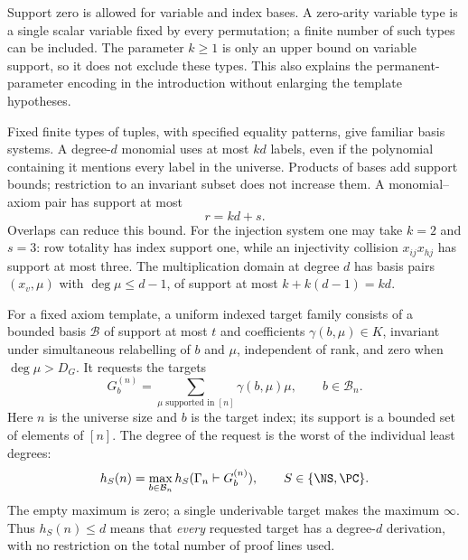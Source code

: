 Support zero is allowed for variable and index bases. A zero-arity
variable type is a single scalar variable fixed by every permutation;
a finite number of such types can be included. The parameter $k\ge1$
is only an upper bound on variable support, so it does not exclude these
types. This also explains the permanent-parameter encoding in the
introduction without enlarging the template hypotheses.

Fixed finite types of tuples, with specified equality patterns, give
familiar basis systems. A degree-$d$ monomial uses at most $kd$ labels,
even if the polynomial containing it mentions every label in the
universe. Products of bases add support bounds; restriction to an
invariant subset does not increase them. A monomial--axiom pair has
support at most
\begin{equation}\label{eq:safe-budget}
                         r=kd+s.
\end{equation}
Overlaps can reduce this bound. For the injection system one may take
$k=2$ and $s=3$: row totality has index support one, while an
injectivity collision $x_{ij}x_{hj}$ has support at most three. The
multiplication domain at degree $d$ has basis pairs $(x_v,\mu)$ with
$\deg\mu\le d-1$, of support at most $k+k(d-1)=kd$.

\begin{definition}\label{def:uniform-target}
For a fixed axiom template, a uniform indexed target family consists of
a bounded basis $\mathcal B$ of support at most $t$ and coefficients
$\gamma(b,\mu)\in K$, invariant under simultaneous relabelling of
$b$ and $\mu$, independent of rank, and zero when $\deg\mu>D_G$.
It requests the targets
\[
 G_b^{(n)}=\sum_{\mu\text{ supported in }[n]}\gamma(b,\mu)\mu,
                         \qquad b\in\mathcal B_n.
\]
Here $n$ is the universe size and $b$ is the target index; its support
is a bounded set of elements of $[n]$.
The degree of the request is the worst of the individual least degrees:
\begin{equation}\label{eq:target-profile}
 h_S(n)=\max_{b\in\mathcal B_n}h_S(\Gamma_n\vdash G_b^{(n)}),
                         \qquad S\in\{\NS,\PC\}.
\end{equation}
The empty maximum is zero; a single underivable target makes the
maximum $\infty$. Thus $h_S(n)\le d$ means that \emph{every} requested
target has a degree-$d$ derivation, with no restriction on the total
number of proof lines used.
\end{definition}

